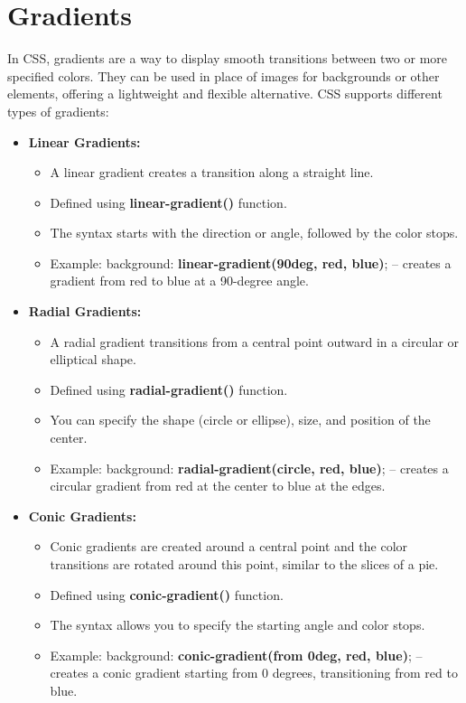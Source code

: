 \documentclass{report}
\begin{document}
    \section{\LARGE Gradients}
    \bigbreak \noindent 
    In CSS, gradients are a way to display smooth transitions between two or more specified colors. They can be used in place of images for backgrounds or other elements, offering a lightweight and flexible alternative. CSS supports different types of gradients:
    \begin{itemize}
    \item \textbf{Linear Gradients:}
    \begin{itemize}
        \item A linear gradient creates a transition along a straight line.
        \item Defined using \textbf{linear-gradient()} function.
        \item The syntax starts with the direction or angle, followed by the color stops.
        \item Example: background: \textbf{linear-gradient(90deg, red, blue)}; – creates a gradient from red to blue at a 90-degree angle.
    \end{itemize}
    \item \textbf{Radial Gradients:}
    \begin{itemize}
        \item A radial gradient transitions from a central point outward in a circular or elliptical shape.
        \item Defined using \textbf{radial-gradient()} function.
        \item You can specify the shape (circle or ellipse), size, and position of the center.
        \item Example: background: \textbf{radial-gradient(circle, red, blue)}; – creates a circular gradient from red at the center to blue at the edges.
    \end{itemize}
    \item \textbf{Conic Gradients:}
    \begin{itemize}
        \item Conic gradients are created around a central point and the color transitions are rotated around this point, similar to the slices of a pie.
        \item Defined using \textbf{conic-gradient()} function.
        \item The syntax allows you to specify the starting angle and color stops.
        \item Example: background: \textbf{conic-gradient(from 0deg, red, blue)}; – creates a conic gradient starting from 0 degrees, transitioning from red to blue.

\end{itemize}
\end{itemize}
\end{document}
